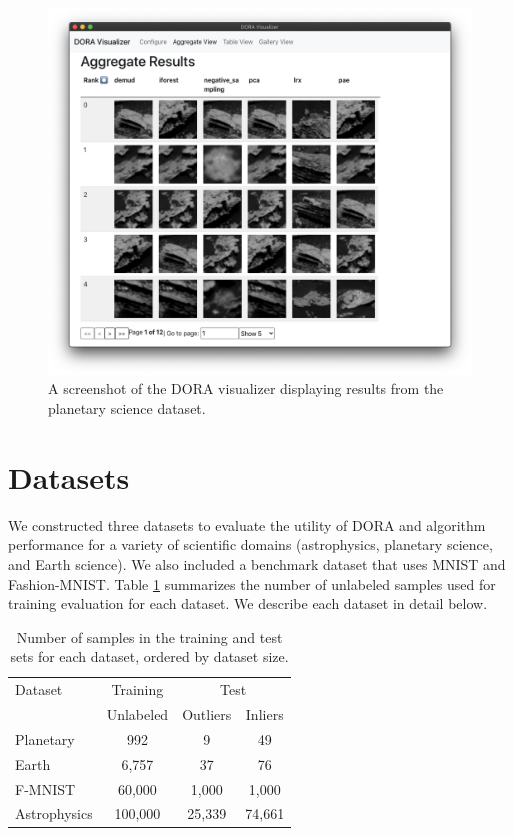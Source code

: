 \documentclass[letterpaper]{article} %
\begin{document}
\begin{figure}
  \centering
  \includegraphics[width=0.83\linewidth]{figures/doravis.png}
  \caption{A screenshot of the DORA visualizer displaying results from the
  planetary science dataset.}
  \label{fig:doravis}
\end{figure}

\section{Datasets}
We constructed three datasets to evaluate the utility of DORA and 
algorithm performance for a variety of scientific domains
 (astrophysics, planetary science, and Earth science). We also included a 
 benchmark dataset that uses MNIST and Fashion-MNIST. Table \ref{tab:datasets}
 summarizes the number of unlabeled samples used for training evaluation for
 each dataset. We describe each dataset in detail below.
 
 \begin{table}
  \caption{Number of samples in the training and test sets for each dataset,
  ordered by dataset size.}
  \label{tab:datasets}
  \centering
  \begin{tabular}{l|c|cc}
    \hline
    Dataset & Training & \multicolumn{2}{c}{Test}\\
     & Unlabeled &  Outliers &  Inliers \\
    
    \hline
    Planetary & 992 &  9 & 49 \\
    Earth & 6,757 & 37 & 76  \\
    F-MNIST & 60,000 & 1,000 & 1,000  \\
    Astrophysics & 100,000   &  25,339 &  74,661 \\
    \hline
  \end{tabular}
\end{table}
\end{document}
